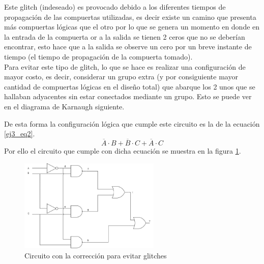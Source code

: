 %
\noindent
Este glitch (indeseado) es provocado debido a los diferentes tiempos de propagaci\'on de las compuertas utilizadas, es decir existe un camino que presenta m\'as compuertas l\'ogicas que el otro por lo que se genera un momento en donde en la entrada de la compuerta or a la salida se tienen 2 ceros que no se deber\'ian encontrar, esto hace que a la salida se observe un cero por un breve instante de tiempo (el tiempo de propagación de la compuerta tomado).\\
Para evitar este tipo de glitch, lo que se hace es realizar una configuración de mayor costo, es decir, considerar un grupo extra (y por consiguiente mayor cantidad de compuertas l\'ogicas en el diseño total) que abarque los 2 unos que se hallaban adyacentes sin estar conectados mediante un grupo. Esto se puede ver en el diagrama de Karnaugh siguiente.
%
\begin{center}
    \begin{Karnaughvuit}
    \end{Karnaughvuit}
\end{center}
%
\noindent
De esta forma la configuraci\'on l\'ogica que cumple este circuito es la de la ecuaci\'on \ref{ej3_eq2}.
%
\begin{equation}
    \overline{A} \cdot B+\overline{B} \cdot C+\overline{A} \cdot C
    \label{ej3_eq2}
\end{equation}
%
\noindent
Por ello el circuito que cumple con dicha ecuación se muestra en la figura \ref{ej3_circuito2}.
%
\begin{figure}[H]
    \centering
        \centering
        \includegraphics[width=0.6\textwidth]{figs/Ej3/circuito2.jpg} %
         \caption{Circuito con la corrección para evitar glitches}
         \label{ej3_circuito2}
\end{figure}
%
%
